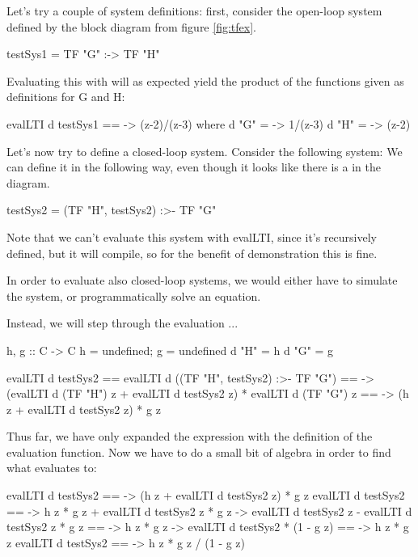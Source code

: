Let's try a couple of system definitions:
first, consider the open-loop system defined by the block diagram from figure \ref{fig:tfex}.
\begin{code}
testSys1 = TF "G" :-> TF "H"
\end{code}
Evaluating this with  will as expected yield the product of the functions given as definitions for G and H:
\begin{codeeq}
evalLTI d testSys1 == \z -> (z-2)/(z-3) where
  d "G" = \z -> 1/(z-3)
  d "H" = \z -> (z-2)
\end{codeeq}
Let's now try to define a closed-loop system. Consider the following system:
We can define it in the following way, even though it looks like there is a \cmd{:-<} in the diagram.
\begin{code}
testSys2 = (TF "H", testSys2) :>- TF "G"
\end{code}
Note that we can't evaluate this system with evalLTI, since it's recursively defined, but it will compile, so for the benefit of demonstration this is fine.

In order to evaluate also closed-loop systems, we would either have to simulate the system, or programmatically solve an equation.

Instead, we will step through the evaluation ...
\begin{codeeq}
h, g :: C -> C
h = undefined; g = undefined
d "H" = h
d "G" = g
\end{codeeq}
\begin{codeeq}
evalLTI d testSys2 
== evalLTI d ((TF "H", testSys2) :>- TF "G")
== \z -> (evalLTI d (TF "H") z + evalLTI d testSys2 z) * evalLTI d (TF "G") z
== \z -> (h z + evalLTI d testSys2 z) * g z
\end{codeeq}
Thus far, we have only expanded the expression with the definition of the evaluation function. Now we have to do a small bit of algebra in order to find what  evaluates to:
\begin{codeeq}
evalLTI d testSys2 == \z -> (h z + evalLTI d testSys2 z) * g z
evalLTI d testSys2 == \z -> h z * g z + evalLTI d testSys2 z * g z
\z -> evalLTI d testSys2 z - evalLTI d testSys2 z * g z == \z -> h z * g z
\z -> evalLTI d testSys2 * (1 - g z) == \z -> h z * g z
evalLTI d testSys2 == \z -> h z * g z / (1 - g z)
\end{codeeq}


